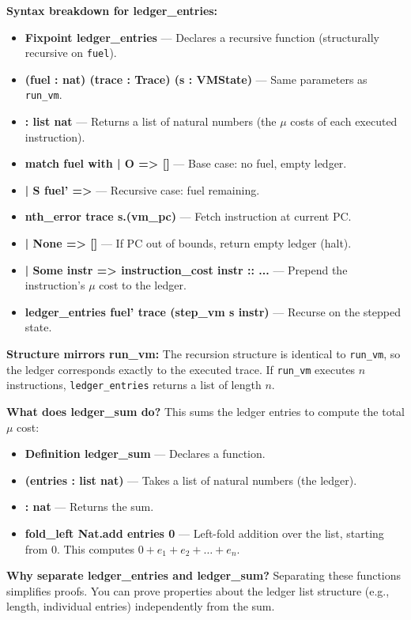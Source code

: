 \textbf{Syntax breakdown for ledger\_entries:}
\begin{itemize}
    \item \textbf{Fixpoint ledger\_entries} — Declares a recursive function (structurally recursive on \texttt{fuel}).
    \item \textbf{(fuel : nat) (trace : Trace) (s : VMState)} — Same parameters as \texttt{run\_vm}.
    \item \textbf{: list nat} — Returns a list of natural numbers (the $\mu$ costs of each executed instruction).
    \item \textbf{match fuel with | O => []} — Base case: no fuel, empty ledger.
    \item \textbf{| S fuel' =>} — Recursive case: fuel remaining.
    \item \textbf{nth\_error trace s.(vm\_pc)} — Fetch instruction at current PC.
    \item \textbf{| None => []} — If PC out of bounds, return empty ledger (halt).
    \item \textbf{| Some instr => instruction\_cost instr :: ...} — Prepend the instruction's $\mu$ cost to the ledger.
    \item \textbf{ledger\_entries fuel' trace (step\_vm s instr)} — Recurse on the stepped state.
\end{itemize}

\textbf{Structure mirrors run\_vm:} The recursion structure is identical to \texttt{run\_vm}, so the ledger corresponds exactly to the executed trace. If \texttt{run\_vm} executes $n$ instructions, \texttt{ledger\_entries} returns a list of length $n$.

\textbf{What does ledger\_sum do?} This sums the ledger entries to compute the total $\mu$ cost:
\begin{itemize}
    \item \textbf{Definition ledger\_sum} — Declares a function.
    \item \textbf{(entries : list nat)} — Takes a list of natural numbers (the ledger).
    \item \textbf{: nat} — Returns the sum.
    \item \textbf{fold\_left Nat.add entries 0} — Left-fold addition over the list, starting from 0. This computes $0 + e_1 + e_2 + \dots + e_n$.
\end{itemize}

\textbf{Why separate ledger\_entries and ledger\_sum?} Separating these functions simplifies proofs. You can prove properties about the ledger list structure (e.g., length, individual entries) independently from the sum.


